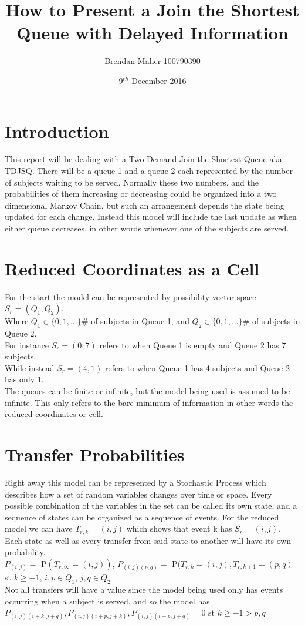 \documentclass[12pt]{article}\usepackage{indentfirst}\usepackage[margin=2cm]{geometry}
\begin{document}
	\title{\Huge{How to Present a Join the Shortest Queue with Delayed Information}}\author{Brendan Maher 100790390}\date{9$^{th}$ December 2016}\maketitle\tableofcontents\newpage
	\section{Introduction}
	This report will be dealing with a Two Demand Join the Shortest Queue aka TDJSQ.  There will be a queue 1 and a queue 2 each represented by the number of subjects waiting to be served.  Normally these two numbers, and the probabilities of them increasing or decreasing could be organized into a two dimensional Markov Chain, but such an arrangement depends the state being updated for each change.  Instead this model will include the last update as when either queue decreases, in other words whenever one of the subjects are served.
	\section{Reduced Coordinates as a Cell}
	For the start the model can be represented by possibility vector space $S_r=(Q_1,Q_2)$.
	\\Where $Q_1\in\{0,1,\dots\}\#$ of subjects in Queue 1, and $Q_2\in\{0,1,\dots\}\#$ of subjects in Queue 2.
	\\For instance $S_r=(0,7)$ refers to when Queue 1 is empty and Queue 2 has 7 subjects.
	\\While instead $S_r=(4,1)$ refers to when Queue 1 has 4 subjects and Queue 2 has only 1.
	\\The queues can be finite or infinite, but the model being used is assumed to be infinite.  This only refers to the bare minimum of information in other words the reduced coordinates or cell.
	\section{Transfer Probabilities}
	Right away this model can be represented by a Stochastic Process which describes how a set of random variables changes over time or space.  Every possible combination of the variables in the set can be called its own state, and a sequence of states can be organized as a sequence of events.  For the reduced model we can have $T_{r,k}=(i,j)$ which shows that event k has $S_r=(i,j)$.  Each state as well as every transfer from said state to another will have its own probability.
	\\$P_{(i,j)}=$ P$(T_{r,\infty}=(i,j))$, $P_{(i,j)(p,q)}=$ P$(T_{r,k}=(i,j),T_{r,k+1}=(p,q)$ st $k\geq-1,\,i,p \in Q_1,\,j,q \in Q_2$
	\\Not all transfers will have a value since the model being used only has events occurring when a subject is served, and so the model has $P_{(i,j)(i+k,j+q)},P_{(i,j)(i+p,j+k)},P_{(i,j)(i+p,j+q)}=0$ st $k\geq-1>p,q$
\end{document}
